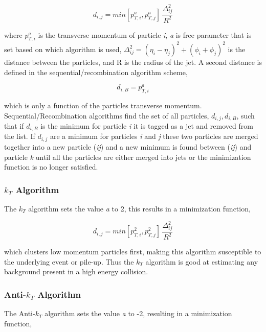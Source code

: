 \begin{equation}
d_{i,j} = min[p^{a}_{T,i},p^{a}_{T,j}] \, \frac{\Delta^{2}_{ij}}{R^{2}}
\label{eq:JetAlgo}
\end{equation}

\noindent
where $p^{a}_{T,i}$ is the transverse momentum of particle \textit{i}, \textit{a} is free parameter that is set based on which algorithm is used, $\Delta^{2}_{ij} = (\eta_{i} - \eta_{j})^{2} + (\phi_{i} + \phi_{j})^{2}$ is the distance between the particles, and R is the radius of the jet.  A second distance is defined in the sequential/recombination algorithm scheme,

\begin{equation}
d_{i,B} = p^{a}_{T,i}
\label{eq:MinJet}
\end{equation}

\noindent
which is only a function of the particles transverse momentum.  Sequential/Recombination algorithms find the set of all particles, ${d_{i,j},d_{i,B}}$, such that if $d_{i,B}$ is the minimum for particle \textit{i} it is tagged as a jet and removed from the list.  If $d_{i,j}$ are a minimum for particles \textit{i} and \textit{j} these two particles are merged together into a new particle (\textit{ij}) and a new minimum is found between (\textit{ij}) and particle \textit{k} until all the particles are either merged into jets or the minimization function is no longer satisfied.

\subsubsection{$k_{T}$ Algorithm}
The $k_{T}$ algorithm sets the value \textit{a} to 2, this results in a minimization function,

\begin{equation}
d_{i,j} = min[p^{2}_{T,i},p^{2}_{T,j}] \, \frac{\Delta^{2}_{ij}}{R^{2}}
\label{eq:kt}
\end{equation}

\noindent
which clusters low momentum particles first, making this algorithm susceptible to the underlying event or pile-up.  Thus the $k_{T}$ algorithm is good at estimating any background present in a high energy collision. 

\subsubsection{Anti-$k_{T}$ Algorithm}
The Anti-$k_{T}$ algorithm sets the value \textit{a} to -2, resulting in a minimization function,

